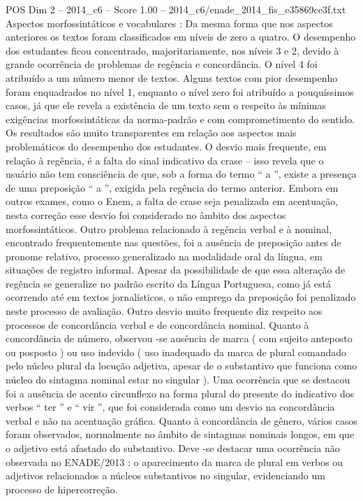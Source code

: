 \begin{textsample}{POS Dim 2 – 2014\_c6 – Score 1.00 – 2014\_c6/enade\_2014\_fis\_e35869ce3f.txt}
Aspectos morfossintáticos e vocabulares : Da mesma forma que nos aspectos anteriores os textos foram classificados em níveis de zero a quatro.
O desempenho dos estudantes ficou concentrado, majoritariamente, nos níveis 3 e 2, devido à grande ocorrência de problemas de regência e concordância.
O nível 4 foi atribuído a um número menor de textos.
Alguns textos com pior desempenho foram enquadrados no nível 1, enquanto o nível zero foi atribuído a pouquíssimos casos, já que ele revela a existência de um texto sem o respeito às mínimas exigências morfossintáticas da norma-padrão e com comprometimento do sentido.
Os resultados são muito transparentes em relação aos aspectos mais problemáticos do desempenho dos estudantes.
O desvio mais frequente, em relação à regência, é a falta do sinal indicativo da crase – isso revela que o usuário não tem consciência de que, sob a forma do termo “ a ”, existe a presença de uma preposição “ a ”, exigida pela regência do termo anterior.
Embora em outros exames, como o Enem, a falta de crase seja penalizada em acentuação, nesta correção esse desvio foi considerado no âmbito dos aspectos morfossintáticos.
Outro problema relacionado à regência verbal e à nominal, encontrado frequentemente nas questões, foi a ausência de preposição antes de pronome relativo, processo generalizado na modalidade oral da língua, em situações de registro informal.
Apesar da possibilidade de que essa alteração de regência se generalize no padrão escrito da Língua Portuguesa, como já está ocorrendo até em textos jornalísticos, o não emprego da preposição foi penalizado neste processo de avaliação.
Outro desvio muito frequente diz respeito aos processos de concordância verbal e de concordância nominal.
Quanto à concordância de número, observou -se ausência de marca ( com sujeito anteposto ou posposto ) ou uso indevido ( uso inadequado da marca de plural comandado pelo núcleo plural da locução adjetiva, apesar de o substantivo que funciona como núcleo do sintagma nominal estar no singular ).
Uma ocorrência que se destacou foi a ausência de acento circunflexo na forma plural do presente do indicativo dos verbos “ ter ” e “ vir ”, que foi considerada como um desvio na concordância verbal e não na acentuação gráfica.
Quanto à concordância de gênero, vários casos foram observados, normalmente no âmbito de sintagmas nominais longos, em que o adjetivo está afastado do substantivo.
Deve -se destacar uma ocorrência não observada no ENADE/2013 : o aparecimento da marca de plural em verbos ou adjetivos relacionados a núcleos substantivos no singular, evidenciando um processo de hipercorreção.

\end{textsample}
